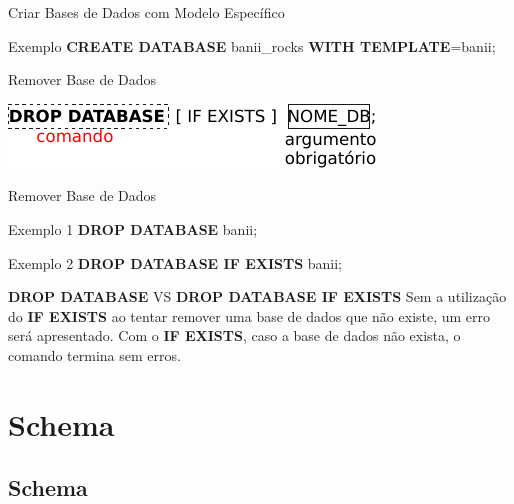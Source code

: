 \documentclass[xcolor=x11names,compress]{beamer}
\begin{document}
\begin{frame}{Criar Bases de Dados com Modelo Específico}

\begin{alertblock}{Exemplo}
\centering \textbf{CREATE DATABASE} banii\_rocks \textbf{WITH TEMPLATE}=banii;
\end{alertblock}

\end{frame}

\begin{frame}{Remover Base de Dados}

\centering \includegraphics[keepaspectratio,width=\textwidth]{drop_database}

\end{frame}

\begin{frame}{Remover Base de Dados}

\begin{alertblock}{Exemplo 1}
\centering \textbf{DROP DATABASE} banii;
\end{alertblock}

\pause

\begin{alertblock}{Exemplo 2}
\centering \textbf{DROP DATABASE IF EXISTS} banii;
\end{alertblock}

\pause

\begin{alertblock}{\textbf{DROP DATABASE} VS \textbf{DROP DATABASE IF EXISTS}}
Sem a utilização do \textbf{IF EXISTS} ao tentar remover uma base de dados que não existe, um erro será apresentado. Com o \textbf{IF EXISTS}, caso a base de dados não exista, o comando termina sem erros.
\end{alertblock}

\end{frame}

\section{Schema}
\subsection{Schema}
\end{document}
